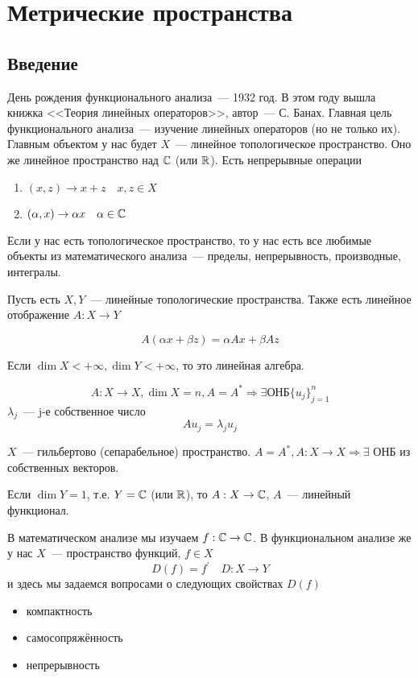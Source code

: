 \documentclass[document]{subfiles}
\begin{document}
\part{Метрические пространства}
\chapter{Введение}
День рождения функционального анализа~--- 1932 год. В этом году вышла книжка <<Теория линейных операторов>>, автор~--- С. Банах. Главная цель функционального анализа~--- изучение линейных операторов (но не только их). Главным объектом у нас будет $X$~--- линейное топологическое пространство. Оно же линейное пространство над $\mathbb{C}$ (или $\mathbb{R}$).
Есть непрерывные операции
\begin{enumerate}
    \item $(x,z) \rightarrow x + z \quad x,z \in X$
    \item $(\alpha,x) \rightarrow \alpha x \quad \alpha \in \mathbb{C}$
\end{enumerate}
Если у нас есть топологическое пространство, то у нас есть все любимые объекты из математического анализа~--- пределы, непрерывность, производные, интегралы.

Пусть есть $X,Y$~--- линейные топологические пространства. Также есть линейное отображение $A: X \rightarrow Y$
\begin{definition}
    \[ A(\alpha x + \beta z) = \alpha A x + \beta A z \]
\end{definition}

Если $\dim X < + \infty, \dim Y < + \infty$, то это линейная алгебра.

\[A: X \rightarrow X, \dim X = n, A = A^* \Rightarrow \exists \text {ОНБ} \{u_j\}_{j=1}^n \]
$\lambda_j$~--- j-е собственное число
\[ A u_j = \lambda_j u_j \]
\begin{theorem}[Гильберт]
    $X$~--- гильбертово (сепарабельное) пространство.
    $A = A^*, A: X \rightarrow X \Rightarrow \exists$ ОНБ из собственных векторов.
\end{theorem}

Если $\dim Y = 1$, т.е. $Y = \mathbb{C}$ (или $\mathbb{R}$), то $A: X \rightarrow \mathbb{C}$, $A$~--- линейный функционал.

В математическом анализе мы изучаем $f: \mathbb{C} \rightarrow \mathbb{C}$.
В функциональном анализе же у нас $X$~--- пространство функций, $f \in X$
   \[ D(f) =  f^\prime \quad D: X \rightarrow Y \]
и здесь мы задаемся вопросами о следующих свойствах $D(f)$
\begin{itemize}
    \item компактность
    \item самосопряжённость
    \item непрерывность
\end{itemize}
\end{document}
